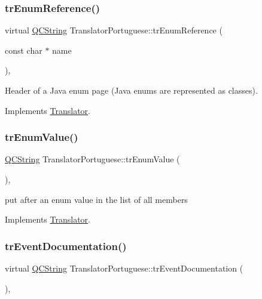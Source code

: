 \subsubsection{\texorpdfstring{trEnumReference()}{trEnumReference()}}
{\footnotesize\ttfamily virtual \mbox{\hyperlink{class_q_c_string}{Q\+C\+String}} Translator\+Portuguese\+::tr\+Enum\+Reference (\begin{DoxyParamCaption}\item[{const char $\ast$}]{name }\end{DoxyParamCaption})\hspace{0.3cm}{\ttfamily [inline]}, {\ttfamily [virtual]}}

Header of a Java enum page (Java enums are represented as classes). 

Implements \mbox{\hyperlink{class_translator}{Translator}}.

\mbox{\label{class_translator_portuguese_a003f65dcb1899d8fa0a7904ea7d1ff45}} 
\subsubsection{\texorpdfstring{trEnumValue()}{trEnumValue()}}
{\footnotesize\ttfamily \mbox{\hyperlink{class_q_c_string}{Q\+C\+String}} Translator\+Portuguese\+::tr\+Enum\+Value (\begin{DoxyParamCaption}{ }\end{DoxyParamCaption})\hspace{0.3cm}{\ttfamily [inline]}, {\ttfamily [virtual]}}

put after an enum value in the list of all members 

Implements \mbox{\hyperlink{class_translator}{Translator}}.

\mbox{\label{class_translator_portuguese_a74a3dcbae4a9f56c143ad597c5eb3295}} 
\subsubsection{\texorpdfstring{trEventDocumentation()}{trEventDocumentation()}}
{\footnotesize\ttfamily virtual \mbox{\hyperlink{class_q_c_string}{Q\+C\+String}} Translator\+Portuguese\+::tr\+Event\+Documentation (\begin{DoxyParamCaption}{ }\end{DoxyParamCaption})\hspace{0.3cm}{\ttfamily [inline]}, {\ttfamily [virtual]}}

